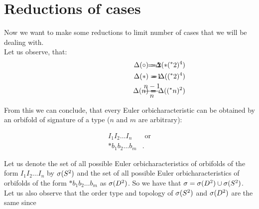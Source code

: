 


\section{Reductions of cases}
Now we want to make some reductions to limit number of cases that we will be dealing with. \\
Let us observe, that:
\begin{align}
\hspace{3cm}\Delta(\circ) =& \hspace{-1cm} &-2& \hspace{-1cm} &= \Delta(*(^*2)^4) \\
\hspace{3cm}\Delta(*) =& \hspace{-1cm} &-1& \hspace{-1cm} &= \Delta((^*2)^4) \\
\hspace{3cm}\Delta(n) =& \hspace{-1cm} &\frac{n-1}{n}& \hspace{-1cm} 
&= \Delta((^*n)^2)\label{third_reduction}
\end{align}

From this we can conclude, that every Euler orbicharacteristic can be obtained 
by an orbifold of signature of a type ($n$ and $m$ are arbitrary):

\begin{align*}
I_1I_2\dots I_n & \textrm{\ or} \\
*b_1b_2\dots b_m &.
\end{align*}

Let us denote the set of all possible Euler orbicharacteristics of orbifolds of the form 
$I_1I_2\dots I_n$ by ${\mathcal{\sigma}(S^2)}$ and the set 
of all possible Euler orbicharacteristics of orbifolds of the form $*b_1b_2\dots b_m$ 
as ${\mathcal{\sigma}(D^2)}$. 
So we have that $\sigma = {\mathcal{\sigma}(D^2)} \cup {\mathcal{\sigma}(S^2)}$. \\
Let us also observe that the order type and topology of ${\mathcal{\sigma}(S^2)}$ and ${\mathcal{\sigma}(D^2)}$ are 
the same since 

